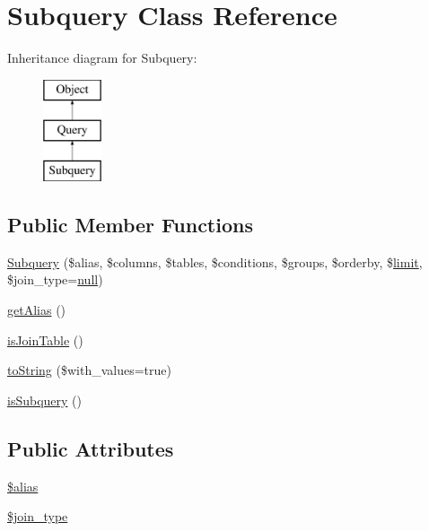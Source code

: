 \hypertarget{classSubquery}{}\section{Subquery Class Reference}
\label{classSubquery}
Inheritance diagram for Subquery\+:\begin{figure}[H]
\begin{center}
\leavevmode
\includegraphics[height=3.000000cm]{classSubquery}
\end{center}
\end{figure}
\subsection*{Public Member Functions}
\begin{DoxyCompactItemize}
\item 
\hyperlink{classSubquery_a9751ca36266ff88cab76d76e73011ea5}{Subquery} (\$alias, \$columns, \$tables, \$conditions, \$groups, \$orderby, \$\hyperlink{classQuery_af2e290d02d3e8c157f9b85b9da1ac08c}{limit}, \$join\+\_\+type=\hyperlink{modernizr_8min_8js_a286f9ec831c5e676eeb493248eab9575}{null})
\item 
\hyperlink{classSubquery_a6e48c79aecdeae3623d9b67b77e15a0e}{get\+Alias} ()
\item 
\hyperlink{classSubquery_a92a4ae32701020381a7725d625926260}{is\+Join\+Table} ()
\item 
\hyperlink{classSubquery_a3a5a5fe8693b68cb0b2745d75fe134fc}{to\+String} (\$with\+\_\+values=true)
\item 
\hyperlink{classSubquery_adea0bfe78ba0f6318fa9f181286e1482}{is\+Subquery} ()
\end{DoxyCompactItemize}
\subsection*{Public Attributes}
\begin{DoxyCompactItemize}
\item 
\hyperlink{classSubquery_a098cb0b2df506793d52ac6b29ca07dae}{\$alias}
\item 
\hyperlink{classSubquery_a20cab7ece0fb2ed4db3c5db11ed8ccc6}{\$join\+\_\+type}
\end{DoxyCompactItemize}


